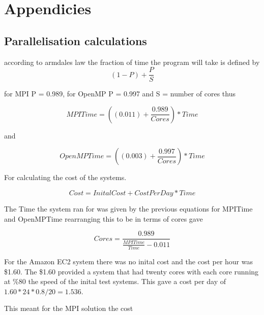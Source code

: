 \section*{Appendicies}

\subsection*{Parallelisation calculations }

according to armdales law the fraction of time the program will take is defined by
\[
 (1-P) + \frac{P}{S}
 \]
 
for MPI P = 0.989, for OpenMP P = 0.997 and S = number of cores thus

\[
 MPITime = ((0.011) + \frac{0.989}{Cores})*Time
 \]
 
 and
 
\[
 OpenMPTime = ((0.003) + \frac{0.997}{Cores})*Time
 \]
 
 For calculating the cost of the systems.
 
\[
 Cost = InitalCost + CostPerDay * Time
 \] 
 
 The Time the system ran for was given by the previous equations for MPITime and OpenMPTime rearranging this to be in terms of cores gave
 
\[
Cores = \frac{0.989}{\frac{MPITime}{Time} - 0.011}
\]
 
 For the Amazon EC2 system there was no inital cost and the cost per hour was \$1.60. The \$1.60 provided a system that had twenty cores with each core running at \%80 the speed of the inital test systems. This gave a cost per day of \(1.60 * 24 * 0.8 / 20 = 1.536\).
 
 This meant for the MPI solution the cost 